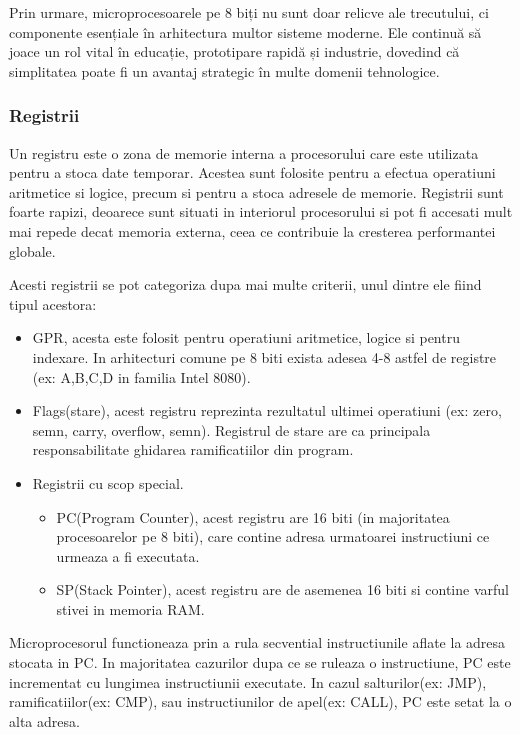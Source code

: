\documentclass[titlepage,12pt]{article}
\begin{document}
    Prin urmare, microprocesoarele pe 8 biți nu sunt doar relicve ale trecutului, ci componente esențiale în arhitectura multor sisteme moderne. Ele continuă să joace un rol vital în educație, prototipare rapidă și industrie, dovedind că simplitatea poate fi un avantaj strategic în multe domenii tehnologice.

    \subsubsection{Registrii}

    Un registru este o zona de memorie interna a procesorului care este utilizata pentru a stoca date temporar. Acestea sunt folosite pentru a efectua operatiuni aritmetice si logice, precum si pentru a stoca adresele de memorie.
    Registrii sunt foarte rapizi, deoarece sunt situati in interiorul procesorului si pot fi accesati mult mai repede decat memoria externa, ceea ce contribuie la cresterea performantei globale.

    Acesti registrii se pot categoriza dupa mai multe criterii, unul dintre ele fiind tipul acestora:
    \begin{itemize}

        \item \ac {GPR}, acesta este folosit pentru operatiuni aritmetice, logice si pentru indexare. In arhitecturi comune pe 8 biti exista adesea 4-8 astfel de registre (ex: A,B,C,D in familia Intel 8080).
        \item Flags(stare), acest registru reprezinta rezultatul ultimei operatiuni (ex: zero, semn, carry, overflow, semn). Registrul de stare are ca principala responsabilitate ghidarea ramificatiilor din program.
        \item Registrii cu scop special.
        \begin{itemize}
            \item PC(Program Counter), acest registru are 16 biti (in majoritatea procesoarelor pe 8 biti), care contine adresa urmatoarei instructiuni ce urmeaza a fi executata.
            \item SP(Stack Pointer), acest registru are de asemenea 16 biti si contine varful stivei in memoria RAM.
        \end{itemize}

    \end{itemize}

    Microprocesorul functioneaza prin a rula secvential instructiunile aflate la adresa stocata in PC.
    In majoritatea cazurilor dupa ce se ruleaza o instructiune, PC este incrementat cu lungimea instructiunii executate.
    In cazul salturilor(ex: JMP), ramificatiilor(ex: CMP), sau instructiunilor de apel(ex: CALL), PC este setat la o alta adresa.
\end{document}
